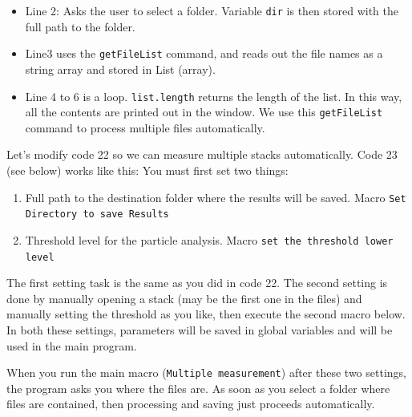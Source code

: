 \documentclass[11pt,a4paper,oneside]{report}
\newcommand{\ilcom}[1]{\texttt{\small#1}}
\begin{document}
\begin{itemize}
\item Line 2: Asks the user to select a folder. Variable \ilcom{dir} is then stored with the full path to the folder. 
\item Line3 uses the \ilcom{getFileList} command, and reads out the file names as a string array and stored in List (array). 
\item Line 4 to 6 is a loop. \ilcom{list.length} returns the length of the list. In this way, all the contents are printed out in the window. 
We use this \ilcom{getFileList} command to process multiple files automatically. 
\end{itemize}

Let's modify code 22 so we can measure multiple stacks automatically. Code 23 (see below) works like this: You must first set two things: 

\begin{enumerate}
\item Full path to the destination folder where the results will be saved. 
Macro \ilcom{Set Directory to save Results}
\item Threshold level for the particle analysis. Macro \ilcom{set the threshold lower level}
\end{enumerate}

The first setting task is the same as you did in code 22. 
The second setting is done by manually opening a stack 
(may be the first one in the files) and manually setting the threshold as you like, 
then execute the second macro below. In both these settings, 
parameters will be saved in global variables and will be used in the main program. 

When you run the main macro (\ilcom{Multiple measurement}) 
after these two settings, the program asks you where the files are. 
As soon as you select a folder where files are contained, 
then processing and saving just proceeds automatically. 


\end{document}
